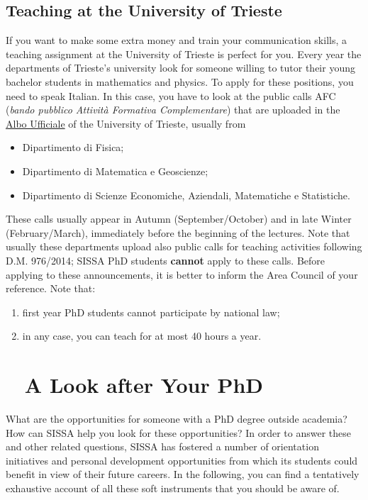 \documentclass{sissavademecum}
\begin{document}
\section{Teaching at the University of Trieste}

If you want to make some extra money and train your communication skills, a teaching assignment at the University of Trieste is perfect for you. Every year the departments of Trieste's university look for someone willing to tutor their young bachelor students in mathematics and physics. To apply for these positions, you need to speak Italian. In this case, you have to look at the public calls AFC (\emph{bando pubblico Attività Formativa Complementare}) that are uploaded in the \href{https://www.units.it/ateneo/albo}{Albo Ufficiale} of the University of Trieste, usually from 
\begin{itemize}
    \item Dipartimento di Fisica;
    \item Dipartimento di Matematica e Geoscienze;
    \item Dipartimento di Scienze Economiche, Aziendali, Matematiche e Statistiche.
\end{itemize}
These calls usually appear in Autumn (September/October) and in late Winter (February/March), immediately before the beginning of the lectures. Note that usually these departments upload also public calls for teaching activities following D.M. 976/2014; SISSA PhD students \textbf{cannot} apply to these calls. Before applying to these announcements, it is better to inform the Area Council of your reference. Note that:
\begin{enumerate}
    \item first year PhD students cannot participate by national law;
    \item in any case, you can teach for at most 40 hours a year. 
\end{enumerate}




\chapter{\texorpdfstring{\faCogs\ }{} A Look after Your PhD}

What are the opportunities for someone with a PhD degree outside academia? How can SISSA help you look for these opportunities? In order to answer these and other related questions, SISSA has fostered a number of orientation initiatives and personal development opportunities from which its students could benefit in view of their future careers. In the following, you can find a tentatively exhaustive account of all these soft instruments that you should be aware of.
\end{document}
